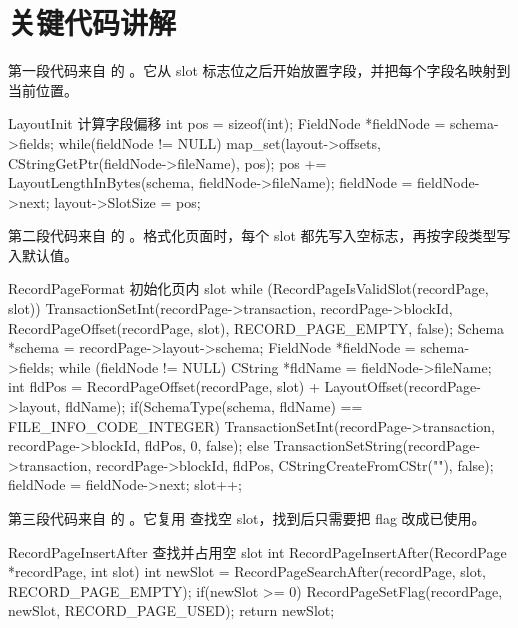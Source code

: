 \section{关键代码讲解}
\label{sec:record-code}

第一段代码来自  的 。它从 slot 标志位之后开始放置字段，并把每个字段名映射到当前位置。

\begin{dbcode}{LayoutInit 计算字段偏移}
int pos = sizeof(int);
FieldNode *fieldNode = schema->fields;
while(fieldNode != NULL){
    map_set(layout->offsets, CStringGetPtr(fieldNode->fileName), pos);
    pos += LayoutLengthInBytes(schema, fieldNode->fileName);
    fieldNode = fieldNode->next;
}
layout->SlotSize = pos;
\end{dbcode}

第二段代码来自  的 。格式化页面时，每个 slot 都先写入空标志，再按字段类型写入默认值。

\begin{dbcode}{RecordPageFormat 初始化页内 slot}
while (RecordPageIsValidSlot(recordPage, slot)){
    TransactionSetInt(recordPage->transaction, recordPage->blockId,
                      RecordPageOffset(recordPage, slot),
                      RECORD_PAGE_EMPTY, false);
    Schema *schema = recordPage->layout->schema;
    FieldNode *fieldNode = schema->fields;
    while (fieldNode != NULL){
        CString *fldName = fieldNode->fileName;
        int fldPos = RecordPageOffset(recordPage, slot)
                   + LayoutOffset(recordPage->layout, fldName);
        if(SchemaType(schema, fldName) == FILE_INFO_CODE_INTEGER){
            TransactionSetInt(recordPage->transaction,
                              recordPage->blockId, fldPos, 0, false);
        }else{
            TransactionSetString(recordPage->transaction,
                                 recordPage->blockId, fldPos,
                                 CStringCreateFromCStr(""), false);
        }
        fieldNode = fieldNode->next;
    }
    slot++;
}
\end{dbcode}

第三段代码来自  的 。它复用  查找空 slot，找到后只需要把 flag 改成已使用。

\begin{dbcode}{RecordPageInsertAfter 查找并占用空 slot}
int RecordPageInsertAfter(RecordPage *recordPage, int slot){
    int newSlot = RecordPageSearchAfter(recordPage, slot,
                                        RECORD_PAGE_EMPTY);
    if(newSlot >= 0){
        RecordPageSetFlag(recordPage, newSlot, RECORD_PAGE_USED);
    }
    return newSlot;
}
\end{dbcode}

